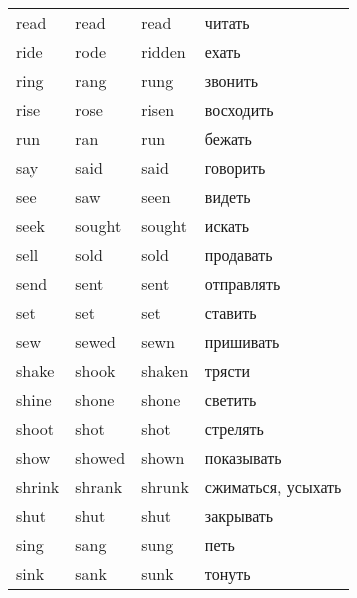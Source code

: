 \begin{longtable}{| m{} | m{} | m{} | m{} |}
    read               & read                & read                    & читать              \\
    ride               & rode                & ridden                  & ехать               \\
    ring               & rang                & rung                    & звонить             \\
    rise               & rose                & risen                   & восходить           \\
    run                & ran                 & run                     & бежать              \\
    say                & said                & said                    & говорить            \\
    see                & saw                 & seen                    & видеть              \\
    seek               & sought              & sought                  & искать              \\
    sell               & sold                & sold                    & продавать           \\
    send               & sent                & sent                    & отправлять          \\
    set                & set                 & set                     & ставить             \\
    sew                & sewed               & sewn                    & пришивать           \\
    shake              & shook               & shaken                  & трясти              \\
    shine              & shone               & shone                   & светить             \\
    shoot              & shot                & shot                    & стрелять            \\
    show               & showed              & shown                   & показывать          \\
    shrink             & shrank              & shrunk                  & сжиматься, усыхать  \\
    shut               & shut                & shut                    & закрывать           \\
    sing               & sang                & sung                    & петь                \\
    sink               & sank                & sunk                    & тонуть              \\

\end{longtable}
